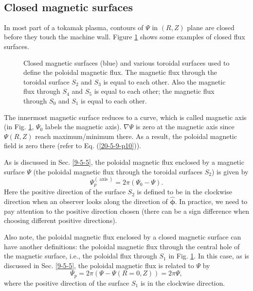 \documentclass{llncs}
\newcommand{\tmmathbf}[1]{\ensuremath{\boldsymbol{#1}}}
\newcommand{\tmop}[1]{\ensuremath{\operatorname{#1}}}
\begin{document}
\

\subsection{Closed magnetic surfaces}

In most part of a tokamak plasma, contours of $\Psi$ in $(R, Z)$ plane are
closed before they touch the machine wall. Figure \ref{7-1-p101} shows some
examples of closed flux surfaces.

\begin{figure}[h]
  \caption{\label{7-1-p101}Closed magnetic surfaces (blue) and various
  toroidal surfaces used to define the poloidal magnetic flux. The magnetic
  flux through the toroidal surface $S_2$ and $S_3$ is equal to each other.
  Also the magnetic flux through $S_4$ and $S_5$ is equal to each other; the
  magnetic flux through $S_0$ and $S_1$ is equal to each other.}
\end{figure}

The innermost magnetic surface reduces to a curve, which is called magnetic
axis (in Fig. \ref{7-1-p101}, $\Psi_0$ labels the magnetic axis). $\nabla
\Psi$ is zero at the magnetic axis since $\Psi (R, Z)$ reach maximum/minimum
there. As a result, the poloidal magnetic field is zero there (refer to Eq.
(\ref{20-5-9-p10})).

As is discussed in Sec. \ref{9-5-5}, the poloidal magnetic flux enclosed by a
magnetic surface $\Psi$ (the poloidal magnetic flux through the toroidal
surfaces $S_2$) is given by
\begin{equation}
  \label{12-30-2} \Psi_p^{(\tmop{axis})} = 2 \pi (\Psi_0 - \Psi) .
\end{equation}
Here the positive direction of the surface $S_2$ is defined to be in the
clockwise direction when an observer looks along the direction of
$\hat{\tmmathbf{\phi}}$. In practice, we need to pay attention to the positive
direction chosen (there can be a sign difference when choosing different
positive directions).

Also note, the poloidal magnetic flux enclosed by a closed magnetic surface
can have another definitions: the poloidal magnetic flux through the central
hole of the magnetic surface, i.e., the poloidal flux through $S_1$ in Fig.
\ref{7-1-p101}. In this case, as is discussed in Sec. \ref{9-5-5}, the
poloidal magnetic flux is related to $\Psi$ by
\begin{equation}
  \Psi_p = 2 \pi (\Psi - \Psi (R = 0, Z)) = 2 \pi \Psi,
\end{equation}
where the positive direction of the surface $S_1$ is in the clockwise
direction.
\end{document}
